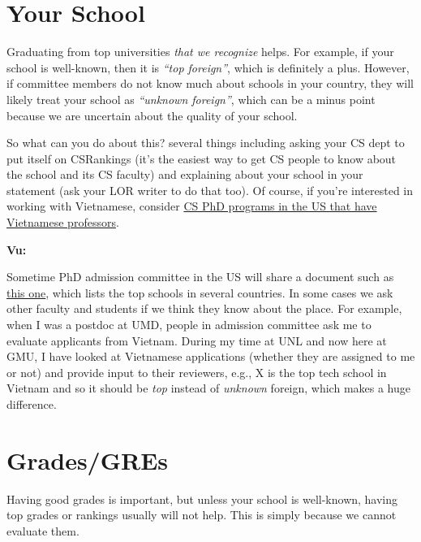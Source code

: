 \documentclass[oneside,11pt]{memoir}
\newenvironment{commentbox}[1][]{
\small
    \begin{mybox}
    {\small \textbf{#1}}
 }{
   \end{mybox}
}
\begin{document}
\section{Your School}\label{sec:your-school}

Graduating from top universities \emph{that we recognize} helps. For example, if your school is well-known, then it is \emph{``top foreign''}, which is definitely a plus.
However, if committee members do not know much about schools in your country, they will likely treat your school as
\emph{``unknown foreign''}, which can be a minus point because we are uncertain about the quality of your school.


So what can you do about this? several things including asking your CS dept to put itself on CSRankings (it's the easiest way to get CS people to know about the school and its CS faculty)  and explaining about your school in your statement (ask your LOR writer to do that too). Of course, if you're interested in working with Vietnamese, consider  \href{https://github.com/dynaroars/dynaroars.github.io/wiki/Viet-CS-Profs-US}{CS PhD programs in the US that have Vietnamese professors}.



\begin{commentbox}[Vu:]
Sometime PhD admission committee in the US will share a document such as \href{https://github.com/dynaroars/dynaroars.github.io/wiki/Foreign-Top-Schools}{this one}, which lists the top schools in several countries. In some cases we ask other faculty and students if we think they know about the place.  For example, when I was a postdoc at UMD, people in admission committee ask me to evaluate applicants from Vietnam.  During my time at UNL and now here at GMU, I have looked at Vietnamese applications (whether they are assigned to me or not) and provide input to their reviewers, e.g., X is the top tech school in Vietnam and so it should be \emph{top} instead of \emph{unknown} foreign, which makes a huge difference.
\end{commentbox}



\section{Grades/GREs}\label{sec:grades}


Having good grades is important, but unless your school is well-known, having top grades or rankings
usually will not help. This is simply because we cannot evaluate them.
\end{document}
